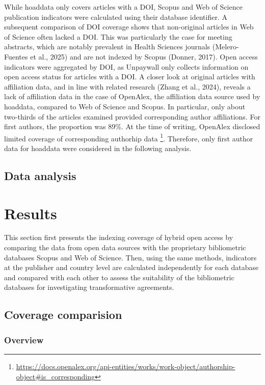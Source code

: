 \documentclass[a4paper,man,floatsintext,longtable,noextraspace,10pt]{apa6}
\begin{document}
While hoaddata only covers articles with a DOI, Scopus and Web of
Science publication indicators were calculated using their database
identifier. A subsequent comparison of DOI coverage shows that
non-original articles in Web of Science often lacked a DOI. This was
particularly the case for meeting abstracts, which are notably prevalent
in Health Sciences journals (Melero-Fuentes et al., 2025) and are not
indexed by Scopus (Donner, 2017). Open access indicators were aggregated
by DOI, as Unpaywall only collects information on open access status for
articles with a DOI. A closer look at original articles with affiliation
data, and in line with related research (Zhang et al., 2024), reveals a
lack of affiliation data in the case of OpenAlex, the affiliation data
source used by hoaddata, compared to Web of Science and Scopus. In
particular, only about two-thirds of the articles examined provided
corresponding author affiliations. For first authors, the proportion was
89\%. At the time of writing, OpenAlex disclosed limited coverage of
corresponding authorhip data \footnote{\url{https://docs.openalex.org/api-entities/works/work-object/authorship-object\#is_corresponding}}.
Therefore, only first author data for hoaddata were considered in the
following analysis.

\subsection{Data analysis}\label{data-analysis}

\section{Results}\label{results}

This section first presents the indexing coverage of hybrid open access
by comparing the data from open data sources with the proprietary
bibliometric databases Scopus and Web of Science. Then, using the same
methods, indicators at the publisher and country level are calculated
independently for each database and compared with each other to assess
the suitability of the bibliometric databases for investigating
transformative agreements.

\subsection{Coverage comparision}\label{coverage-comparision}

\subsubsection{Overview}\label{overview}
\end{document}
